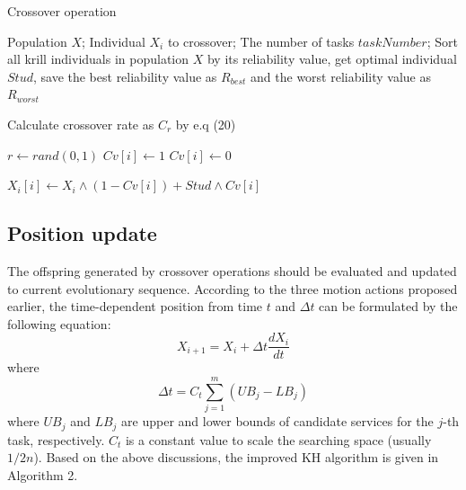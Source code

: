 \documentclass[journal]{IEEEtran}
\begin{document}
\begin{algorithm}
\caption{Crossover operation}
\label{alg1}
\begin{algorithmic}[1]

\REQUIRE Population $X$; Individual $X_i$ to crossover; The number of tasks $taskNumber$; 
\STATE Sort all krill individuals in population $X$ by its reliability value, get optimal individual $Stud$, save the best reliability value as $R_{best}$ and the worst reliability value as $R_{worst}$

\STATE Calculate crossover rate as $C_{r}$ by e.q (20)

\STATE $r \leftarrow rand(0,1)$
\STATE $Cv[i] \leftarrow 1$
\ELSE
\STATE $Cv[i] \leftarrow 0$
\ENDIF
\ENDFOR

\STATE $X_i[i] \leftarrow X_i \wedge  (1-Cv[i]) + Stud \wedge Cv[i]$ 
\ENDFOR
\end{algorithmic}
\end{algorithm}

\subsection{Position update}
The offspring generated by crossover operations should be evaluated and updated to current evolutionary sequence.
According to the three motion actions proposed earlier, the time-dependent position from time $t$ and $\Delta t$ can be formulated by the following equation:
\begin{equation}
X_{i+1} = X_i + \Delta t \frac{dX_i}{dt}
\end{equation}
where
\begin{equation}
\Delta t = C_t\sum_{j=1}^{m}(UB_j - LB_j)
\end{equation}
where $UB_j$ and $LB_j$ are upper and lower bounds of candidate services for the $j$-th task, respectively. $C_t$ is a constant value to scale the searching space (usually $1/2n$). 
Based on the above discussions, the improved KH algorithm is given in Algorithm 2.
\end{document}
